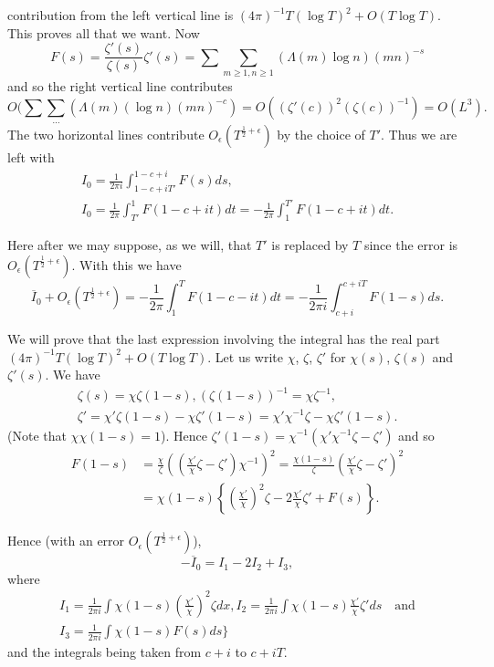 contribution from the left vertical line is\pageoriginale
$(4\pi)^{-1}T(\log T)^{2}+O(T\log T)$. This proves all that we
want. Now
\begin{equation*}
F(s)=\frac{\zeta'(s)}{\zeta(s)}\zeta'(s)=\sum\sum_{m\geq 1,n\geq
  1}(\Lambda(m)\log n)(mn)^{-s}\tag{5.4.3}\label{c5:eq5.4.3}
\end{equation*}
and so the right vertical line contributes
$$O(\sum\sum\limits_{\cdots}(\Lambda(m)(\log
n)(mn)^{-c})=O((\zeta'(c))^{2}(\zeta(c))^{-1})=O(L^{3}).$$ 
The two horizontal lines contribute  $O_{\epsilon}(T^{\frac{1}{2}+\epsilon})$
by the choice of $T'$. Thus we are left with 
\begin{gather*}
I_{0}=\frac{1}{2\pi
  i}\int^{1-c+i}_{1-c+iT'}F(s)ds,\tag{5.4.4}\label{c5:eq5.4.4}\\
I_{0}=\frac{1}{2\pi}\int^{1}_{T'}F(1-c+it)dt=-\frac{1}{2\pi}\int^{T'}_{1}F(1-c+it)dt.\tag{5.4.5}\label{c5:eq5.4.5} 
\end{gather*}

Here after we may suppose, as we will, that $T'$ is replaced by $T$
since the error is $O_{\epsilon}(T^{\frac{1}{2}+\epsilon})$. With this
we have
\begin{equation*}
\overline{I}_{0}+O_{\epsilon}(T^{\frac{1}{2}+\epsilon})=-\frac{1}{2\pi}\int^{T}_{1}F(1-c-it)dt=-\frac{1}{2\pi
  i}\int^{c+iT}_{c+i}F(1-s)ds.\tag{5.4.6}\label{c5:eq5.4.6} 
\end{equation*}

We will prove that the last expression involving the integral has the
real part $(4\pi)^{-1}T(\log T)^{2}+O(T\log T)$. Let us write $\chi$,
$\zeta$, $\zeta'$ for $\chi(s)$, $\zeta(s)$ and $\zeta'(s)$. We have
\begin{gather*}
\zeta(s)=\chi\zeta(1-s),(\zeta(1-s))^{-1}=\chi\zeta^{-1},\\
\zeta'=\chi'\zeta(1-s)-\chi\zeta'(1-s)=\chi'\chi^{-1}\zeta-\chi \zeta'(1-s).
\end{gather*}
(Note that $\chi\chi(1-s)=1$). Hence
$\zeta'(1-s)=\chi^{-1}(\chi'\chi^{-1}\zeta-\zeta')$ and so
\begin{align*}
F(1-s) &=
\frac{\chi}{\zeta}\left(\left(\frac{\chi'}{\chi}\zeta-\zeta'\right)\chi^{-1}\right)^{2}=\frac{\chi(1-s)}{\zeta}\left(\frac{\chi'}{\chi}\zeta-\zeta'\right)^{2}\\ 
&=
\chi(1-s)\left\{\left(\frac{\chi'}{\chi}\right)^{2}\zeta-2\frac{\chi'}{\chi}\zeta'+F(s)\right\}.\tag{5.4.7} 
\end{align*}

Hence (with an error $O_{\epsilon}(T^{\frac{1}{2}+\epsilon})$),
\begin{equation*}
-\overline{I}_{0}=I_{1}-2I_{2}+I_{3},\tag{5.4.8}\label{c5:eq5.4.8}
\end{equation*}
where\pageoriginale
\begin{gather*}
I_{1}=\frac{1}{2\pi i}\int
\chi(1-s)\left(\frac{\chi'}{\chi}\right)^{2}\zeta dx,
I_{2}=\frac{1}{2\pi i}\int
\chi(1-s)\frac{\chi'}{\chi}\zeta'ds \quad\text{and}\\
I_{3}=\frac{1}{2\pi
  i}\int\chi(1-s)F(s)ds\Big\}\tag{5.4.9}\label{c5:eq5.4.9} 
\end{gather*}
and the integrals being taken from $c+i$ to $c+iT$. 

